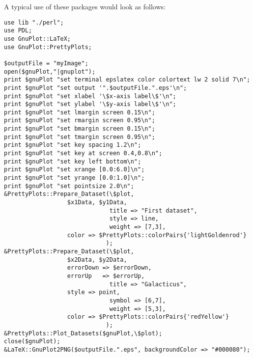 A typical use of these packages would look as follows:
\begin{verbatim}
use lib "./perl";
use PDL;
use GnuPlot::LaTeX;
use GnuPlot::PrettyPlots;

$outputFile = "myImage";
open($gnuPlot,"|gnuplot");
print $gnuPlot "set terminal epslatex color colortext lw 2 solid 7\n";
print $gnuPlot "set output '".$outputFile.".eps'\n";
print $gnuPlot "set xlabel '\$x-axis label\$'\n";
print $gnuPlot "set ylabel '\$y-axis label\$'\n";
print $gnuPlot "set lmargin screen 0.15\n";
print $gnuPlot "set rmargin screen 0.95\n";
print $gnuPlot "set bmargin screen 0.15\n";
print $gnuPlot "set tmargin screen 0.95\n";
print $gnuPlot "set key spacing 1.2\n";
print $gnuPlot "set key at screen 0.4,0.8\n";
print $gnuPlot "set key left bottom\n";
print $gnuPlot "set xrange [0.0:6.0]\n";
print $gnuPlot "set yrange [0.0:1.0]\n";
print $gnuPlot "set pointsize 2.0\n";
&PrettyPlots::Prepare_Dataset(\$plot,
			      $x1Data, $y1Data,
                              title => "First dataset",
                              style => line,
                              weight => [7,3],
			      color => $PrettyPlots::colorPairs{'lightGoldenrod'}
                             );
&PrettyPlots::Prepare_Dataset(\$plot,
			      $x2Data, $y2Data,
			      errorDown => $errorDown,
			      errorUp   => $errorUp,
                              title => "Galacticus",
			      style => point,
                              symbol => [6,7],
                              weight => [5,3],
			      color => $PrettyPlots::colorPairs{'redYellow'}
                             );
&PrettyPlots::Plot_Datasets($gnuPlot,\$plot);
close($gnuPlot);
&LaTeX::GnuPlot2PNG($outputFile.".eps", backgroundColor => "#000080");
\end{verbatim}

